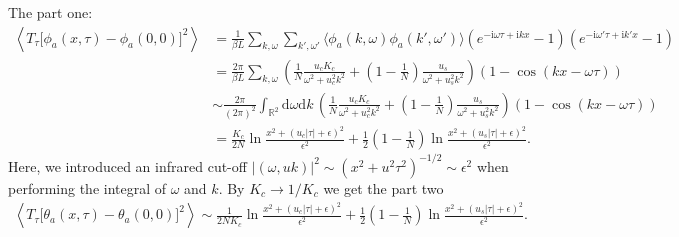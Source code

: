 \documentclass[10pt]{extarticle}
\newcommand{\dd}{\mathrm{d}}
\newcommand{\ii}{\mathrm{i}}
\begin{document}
The part one:
\begin{align*}
	\left\langle T_\tau\bigl[\phi_a(x,\tau)-\phi_a(0,0)\bigr]^2\right\rangle
	&=\frac{1}{\beta L}\sum_{k,\omega}\sum_{k',\omega'}\langle \phi_a(k,\omega)\phi_a(k',\omega')\rangle (e^{-\ii \omega\tau+\ii k x}-1)(e^{-\ii \omega'\tau+\ii k' x}-1)\\
	&=\frac{2\pi}{\beta L}\sum_{k,\omega}\left(\frac{1}{N}\frac{u_c K_c}{\omega^2+u_c^2k^2}+\left(1-\frac{1}{N}\right)\frac{u_s}{\omega^2+u_s^2k^2}\right)(1-\cos(kx-\omega\tau))\\
	&\sim \frac{2\pi}{(2\pi)^2}\int_{\mathbb{R}^2} \dd\omega\dd k\,\left(\frac{1}{N}\frac{u_c K_c}{\omega^2+u_c^2k^2}+\left(1-\frac{1}{N}\right)\frac{u_s}{\omega^2+u_s^2k^2}\right)(1-\cos(kx-\omega\tau))\\
	&=\frac{K_c}{2N} \ln \frac{x^2+(u_c|\tau|+\epsilon)^2}{\epsilon^2}+\frac 1 2 \left(1-\frac 1 N\right) \ln \frac{x^2+(u_s|\tau|+\epsilon)^2}{\epsilon^2}.
\end{align*}
Here, we introduced an infrared cut-off $|(\omega,uk)|^2\sim (x^2+u^2 \tau^2)^{-1/2}\sim \epsilon^2$ when performing the integral of $\omega$ and $k$. By $K_c\to 1/K_c$ we get the part two
\begin{align*}
	\left\langle T_\tau\bigl[\theta_a(x,\tau)-\theta_a(0,0)\bigr]^2\right\rangle\sim \frac{1}{2NK_c} \ln \frac{x^2+(u_c|\tau|+\epsilon)^2}{\epsilon^2}+\frac 1 2 \left(1-\frac 1 N\right) \ln \frac{x^2+(u_s|\tau|+\epsilon)^2}{\epsilon^2}.
\end{align*}
\end{document}
